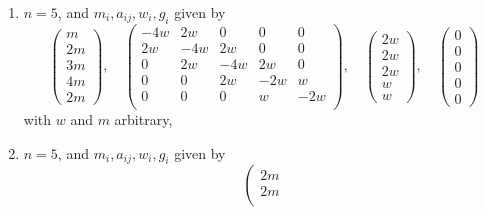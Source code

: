 \begin{lemma}
\begin{enumerate}
$$\begin{matrix}
0 & 0 & 0 & 2w & -4w \\
\end{matrix}
\right),
\quad
\left(
\begin{matrix}
w \\
w \\
w \\
2w \\
2w
\end{matrix}
\right),
\quad
\left(
\begin{matrix}
0 \\
0 \\
0 \\
0 \\
0
\end{matrix}
\right)
$$
with $w$ and $m$ arbitrary,
\item
\label{item-equal-equal-down-equal}
$n = 5$, and $m_i, a_{ij}, w_i, g_i$ given by
$$
\left(
\begin{matrix}
m \\
2m \\
3m \\
4m \\
2m
\end{matrix}
\right),
\quad
\left(
\begin{matrix}
-4w & 2w & 0 & 0 & 0 \\
2w & -4w & 2w & 0 & 0 \\
0 & 2w & -4w & 2w & 0 \\
0 & 0 & 2w & -2w & w \\
0 & 0 & 0 & w & -2w \\
\end{matrix}
\right),
\quad
\left(
\begin{matrix}
2w \\
2w \\
2w \\
w \\
w
\end{matrix}
\right),
\quad
\left(
\begin{matrix}
0 \\
0 \\
0 \\
0 \\
0
\end{matrix}
\right)
$$
with $w$ and $m$ arbitrary,
\item
\label{item-up-equal-equal-up}
$n = 5$, and $m_i, a_{ij}, w_i, g_i$ given by
$$
\left(
\begin{matrix}
2m \\
2m \\

\end{matrix}$$
\end{enumerate}
\end{lemma}
